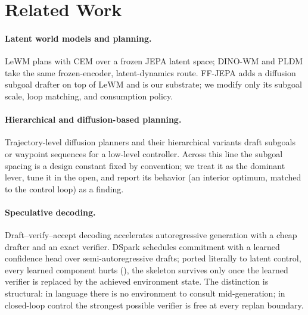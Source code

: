 \documentclass{article}
\begin{document}
\section{Related Work}
\label{sec:related}

\paragraph{Latent world models and planning.} LeWM \citep{lewm} plans with CEM
\citep{cem} over a frozen JEPA latent space; DINO-WM \citep{dinowm} and PLDM
\citep{pldm} take the same frozen-encoder, latent-dynamics route. FF-JEPA
\citep{ffjepa} adds a diffusion subgoal drafter on top of LeWM and is our substrate;
we modify only its subgoal scale, loop matching, and consumption policy.

\paragraph{Hierarchical and diffusion-based planning.} Trajectory-level diffusion
planners \citep{janner2022diffuser} and their hierarchical variants
\citep{chen2024hierarchical} draft subgoals or waypoint sequences for a low-level
controller. Across this line the subgoal spacing is a design constant fixed by
convention; we treat it as the dominant lever, tune it in the open, and report its
behavior (an interior optimum, matched to the control loop) as a finding.

\paragraph{Speculative decoding.} Draft--verify--accept decoding
\citep{leviathan2023fast,chen2023accelerating} accelerates autoregressive generation
with a cheap drafter and an exact verifier. DSpark \citep{dspark} schedules
commitment with a learned confidence head over semi-autoregressive drafts; ported
literally to latent control, every learned component hurts (), the skeleton survives only once the learned verifier is replaced by the achieved
environment state. The distinction is structural: in language there is no environment
to consult mid-generation; in closed-loop control the strongest possible verifier is
free at every replan boundary.
\end{document}
